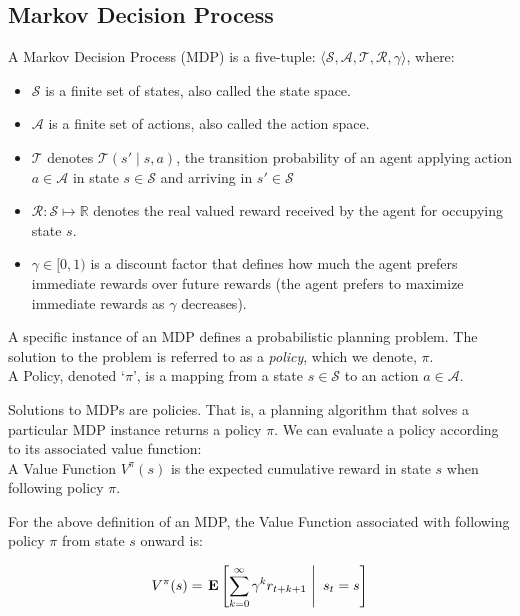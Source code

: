 \documentclass[11pt]{article}
\begin{document}
\subsection{Markov Decision Process}
{ A \textup{Markov Decision Process (MDP)} is a five-tuple: $\langle \mathcal{S},
\mathcal{A}, \mathcal{T}, \mathcal{R}, \gamma \rangle$, where:
\begin{itemize}
\item $\mathcal{S}$ is a finite set of states, also called the \textup{state space}.
\item $\mathcal{A}$ is a finite set of actions, also called the \textup{action space}.
\item $\mathcal{T}$ denotes $\mathcal{T}(s' \mid s,a)$, the
transition probability of an agent applying action $a \in \mathcal{A}$
in state $s \in \mathcal{S}$ and arriving in $s' \in \mathcal{S}$
\item $\mathcal{R} : \mathcal{S}\mapsto \mathbb{R}$ denotes the real valued reward received by the agent for occupying state $s$.
\item $\gamma \in [0, 1)$ is a discount factor that defines how much the
  agent prefers immediate rewards over future rewards (the agent
  prefers to maximize immediate rewards as $\gamma$ decreases).
\end{itemize}}

A specific instance of an MDP defines a probabilistic planning problem. The solution to the problem is referred to as a {\it policy}, which we denote, $\pi$. \\

{ A \textup{Policy}, denoted `$\pi$', is a mapping from a state $s \in \mathcal{S}$ to an action $a \in \mathcal{A}$.}

Solutions to MDPs are policies. That is, a planning algorithm that solves a particular MDP instance returns a policy $\pi$. We can evaluate a policy according to its associated value function: \\

{ A \textup{Value Function} $V^\pi(s)$ is the expected cumulative reward in state $s$ when following policy $\pi$.}

For the above definition of an MDP, the Value Function associated with following policy $\pi$ from state $s$ onward is:

\begin{equation}
V^\pi(s) = \left.{\bf E} \left[ \sum_{k=0}^\infty \gamma^k r_{t+k+1}\ \right|\ s_t = s \right]
\end{equation}
\end{document}
